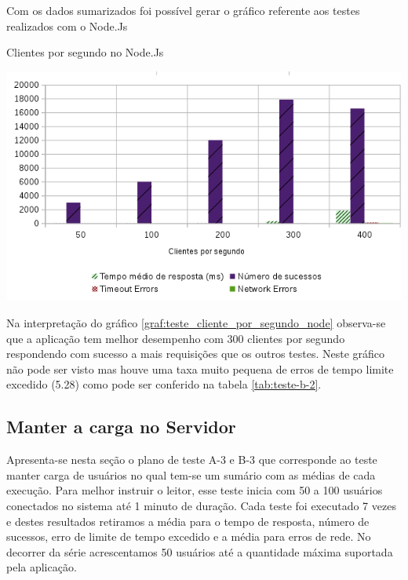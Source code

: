   Com os dados sumarizados foi possível gerar o gráfico referente aos testes realizados com o Node.Js

  \begin{grafico}[H]
    \setlength{\abovecaptionskip}{5pt}
    \setlength{\belowcaptionskip}{0pt}

    \caption[Clientes por segundo no Node.Js]
	    {Clientes por segundo no Node.Js}
    \centering
    \includegraphics[width=.80\textwidth]{imagem/graficos/grafico_node_plano_de_teste_2.png}
    \captionsetup[grafico]{justification=centering}
    \label{graf:teste_cliente_por_segundo_node}
  \end{grafico}

  Na interpretação do gráfico \ref{graf:teste_cliente_por_segundo_node} observa-se que a aplicação tem melhor desempenho
  com 300 clientes por segundo respondendo com sucesso a mais requisições que os outros testes. Neste gráfico não pode
  ser visto mas houve uma taxa muito pequena de erros de tempo limite excedido (5.28) como pode ser conferido na tabela
  \ref{tab:teste-b-2}.



\subsection{Manter a carga no Servidor}


  Apresenta-se nesta seção o plano de teste A-3 e B-3 que corresponde ao teste manter carga de usuários no qual tem-se um sumário
  com as médias de cada execução.
  Para melhor instruir o leitor, esse teste inicia com 50 a 100 usuários conectados no sistema até 1 minuto de duração. Cada teste
  foi executado 7 vezes e destes resultados retiramos a média para o tempo de resposta, número de sucessos, erro de limite de tempo excedido
  e a média para erros de rede. No decorrer da série acrescentamos 50 usuários até a quantidade máxima suportada pela aplicação.


